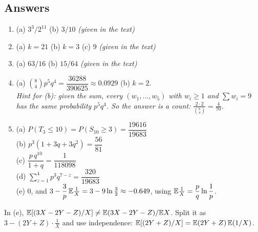 \subsection*{Answers}
\begin{enumerate}[label=\textbf{P\arabic*.},leftmargin=*]
  \item (a) $3^3/2^{11}$ \quad (b) $3/10$ \hfill \emph{(given in the text)}
  \item (a) $k=21$ \quad (b) $k=3$ \quad (c) $9$ \hfill \emph{(given in the text)}
  \item (a) $63/16$ \quad (b) $15/64$ \hfill \emph{(given in the text)}
  \item (a) $\binom84 p^5q^4 = \dfrac{36288}{390625}\approx 0.0929$ \quad (b) $k = 2$.\\
  \emph{Hint for (b): given the sum, every $(w_1,\dots,w_5)$ with $w_i\ge1$ and $\sum w_i=9$ has the same probability $p^5q^4$. So the answer is a count: $\frac{2\cdot2}{\binom84} = \frac{4}{70}$.}
  \item (a) $P(T_3\le10)=P(S_{10}\ge3) = \dfrac{19616}{19683}$ \\
  (b) $p^3(1+3q+3q^2) = \dfrac{56}{81}$ \\
  (c) $\dfrac{p\,q^{10}}{1+q} = \dfrac{1}{118098}$ \\
  (d) $\sum_{z=1}^{4} p^3 q^{7-z} = \dfrac{320}{19683}$ \\
  (e) $0$, and $3 - \dfrac3p\,\mathbb{E}\tfrac1X = 3 - 9\ln\tfrac32 \approx -0.649$, using $\mathbb{E}\tfrac1X = \dfrac{p}{q}\ln\dfrac1p$.
\end{enumerate}
\begin{remark}
In (e), $\mathbb{E}[(3X-2Y-Z)/X] \ne \mathbb{E}(3X-2Y-Z)/\mathbb{E} X$. Split it as $3 - (2Y+Z)\cdot\tfrac1X$ and use independence: $\mathbb{E}[(2Y+Z)/X] = \mathbb{E}(2Y+Z)\,\mathbb{E}(1/X)$.
\end{remark}
